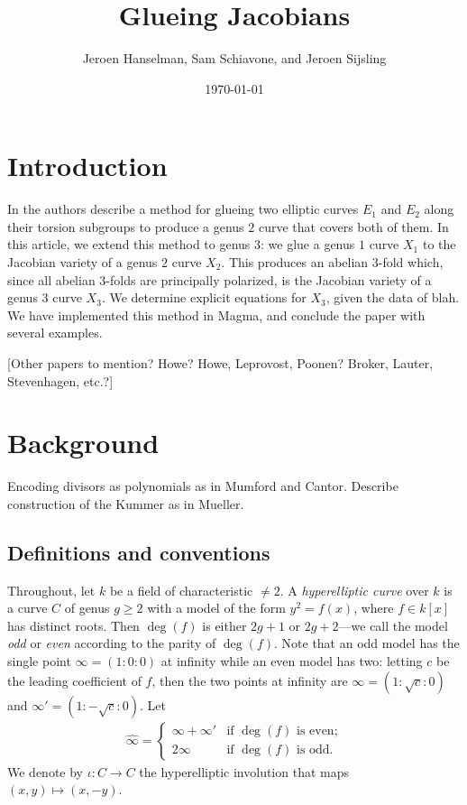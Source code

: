 \documentclass[reqno, 12pt]{amsart}
\theoremstyle{definition}
\newcommand{\wh}{\widehat}
\newcommand{\sss}[1]{{\color{blue} [#1]}}
\begin{document}
\title{Glueing Jacobians}
\author{Jeroen Hanselman, Sam Schiavone, and Jeroen Sijsling}
\date{\today}

\maketitle

\tableofcontents

\section{Introduction}
In \cite{FreyKani}
the authors describe a method for glueing two elliptic curves $E_1$ and $E_2$ along their torsion subgroups to produce a genus $2$ curve that covers both of them. In this article, we extend this method to genus $3$: we glue a genus $1$ curve $X_1$ to the Jacobian variety of a genus $2$ curve $X_2$. This produces an abelian $3$-fold which, since all abelian $3$-folds are principally polarized, is the Jacobian variety of a genus $3$ curve $X_3$. We determine explicit equations for $X_3$, given the data of blah. We have implemented this method in \textsf{Magma}, and conclude the paper with several examples.

\sss{Other papers to mention? Howe? Howe, Leprovost, Poonen? Broker, Lauter, Stevenhagen, etc.?}

\section{Background}

Encoding divisors as polynomials as in Mumford and Cantor. Describe construction of the Kummer as in Mueller.

\subsection{Definitions and conventions}
Throughout, let $k$ be a field of characteristic $\neq 2$. A \textit{hyperelliptic curve} over $k$ is a curve $C$ of genus $g \geq 2$ with a model of the form $y^2 = f(x)$, where $f \in k[x]$ has distinct roots. Then $\deg(f)$ is either $2g+1$ or $2g+2$---we call the model \textit{odd} or \textit{even} according to the parity of $\deg(f)$. Note that an odd model has the single point $\infty = (1:0:0)$ at infinity while an even model has two: letting $c$ be the leading coefficient of $f$, then the two points at infinity are $\infty = (1:\sqrt{c}:0)$ and $\infty' = (1:-\sqrt{c}:0)$. Let
\begin{align} \label{infty}
\wh{\infty} =
\begin{cases}
\infty + \infty' & \text{if $\deg(f)$ is even;}\\
2 \infty & \text{if $\deg(f)$ is odd}.
\end{cases}
\end{align}
We denote by $\iota: C \to C$ the hyperelliptic involution that maps $(x,y) \mapsto (x,-y)$.
\end{document}
